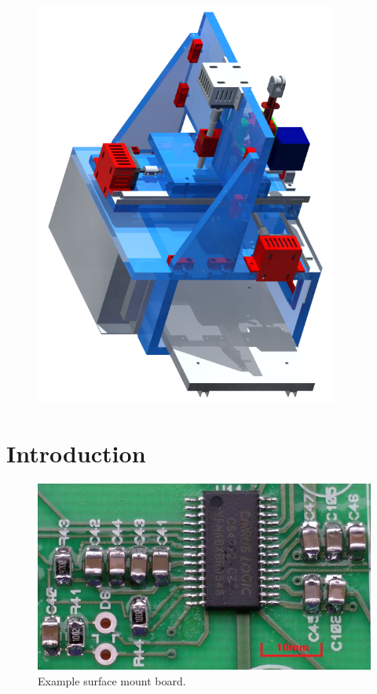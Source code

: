 \begin{figure}[ht!]
\centering
\includegraphics[width=100mm]{resources/render.png}
\label{render}
\end{figure}

\newpage
\tableofcontents

\newpage

\section{Introduction}

\begin{figure}[ht!]
\centering
\includegraphics[width=120mm]{resources/smt_soldering.jpg}
\caption{Example surface mount board.}
\label{smdexample}
\end{figure}

